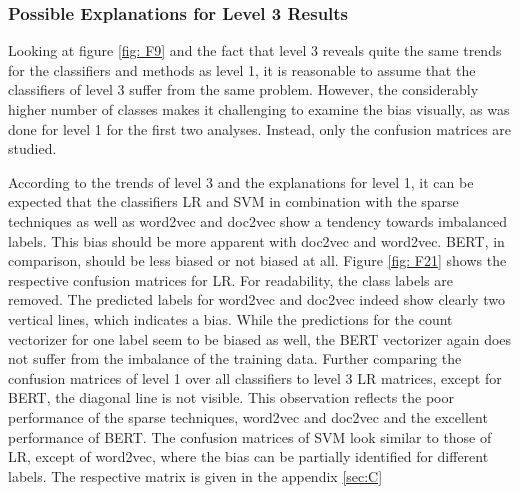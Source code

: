 \documentclass[12pt, a4paper, titlepage]{article}
\begin{document}
\subsubsection*{Possible Explanations for Level 3 Results}
Looking at figure \ref{fig: F9} and the fact that level 3 reveals quite the same trends for the classifiers and methods as level 1, it is reasonable to assume that the classifiers of level 3 suffer from the same problem. However, the considerably higher number of classes makes it challenging to examine the bias visually, as was done for level 1 for the first two analyses. Instead, only the confusion matrices are studied.

According to the trends of level 3 and the explanations for level 1, it can be expected that the classifiers \ac{LR} and \ac{SVM} in combination with the sparse techniques as well as word2vec and doc2vec show a tendency towards imbalanced labels. This bias should be more apparent with doc2vec and word2vec. \ac{BERT}, in comparison, should be less biased or not biased at all. Figure \ref{fig: F21} shows the respective confusion matrices for \ac{LR}. For readability, the class labels are removed. The predicted labels for word2vec and doc2vec indeed show clearly two vertical lines, which indicates a bias. While the predictions for the count vectorizer for one label seem to be biased as well, the \ac{BERT} vectorizer again does not suffer from the imbalance of the training data. Further comparing the confusion matrices of level 1 over all classifiers to level 3 \ac{LR} matrices, except for \ac{BERT}, the diagonal line is not visible. This observation reflects the poor performance of the sparse techniques, word2vec and doc2vec and the excellent performance of \ac{BERT}. The confusion matrices of \ac{SVM} look similar to those of \ac{LR}, except of word2vec, where the bias can be partially identified for different labels. The respective matrix is given in the appendix \ref{sec:C}
\end{document}
